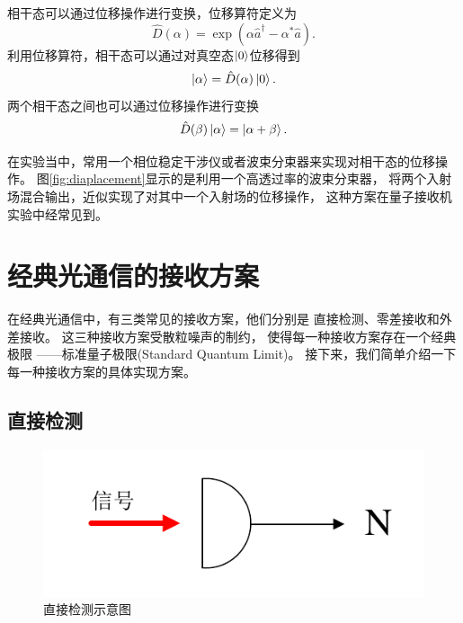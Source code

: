 相干态可以通过位移操作进行变换，位移算符定义为\cite{glauber1963coherent,gerry2005introductory,helstrom1976quantum,mandel1995optical}
\begin{equation}
\hat{D}(\alpha) = \exp(\alpha \hat{a}^\dagger - \alpha^* \hat{a}).
\end{equation}
利用位移算符，相干态可以通过对真空态$\ket{0}$位移得到
\begin{equation}
\ket{\alpha} = \hat{D}(\alpha) \ket{0}.
\end{equation}
两个相干态之间也可以通过位移操作进行变换
\begin{equation}
\hat{D}(\beta) \ket{\alpha} = \ket{\alpha + \beta} .
\end{equation}


在实验当中，常用一个相位稳定干涉仪或者波束分束器来实现对相干态的位移操作\cite{cook2007optical,becerra2013experimental,lau2006binary,paris1996displacement}。
图\ref{fig:diaplacement}显示的是利用一个高透过率的波束分束器，
将两个入射场混合输出，近似实现了对其中一个入射场的位移操作，
这种方案在量子接收机实验中经常见到。

\section{经典光通信的接收方案}

在经典光通信中，有三类常见的接收方案，他们分别是
直接检测、零差接收和外差接收。
这三种接收方案受散粒噪声的制约，
使得每一种接收方案存在一个经典极限
——标准量子极限(Standard Quantum Limit)。
接下来，我们简单介绍一下每一种接收方案的具体实现方案。

\subsection{直接检测}



\begin{figure}
\centering
  \includegraphics[scale=1]{figures/chap2/DD.pdf}
  \caption{直接检测示意图}
  \label{fig:DD}
\end{figure}


